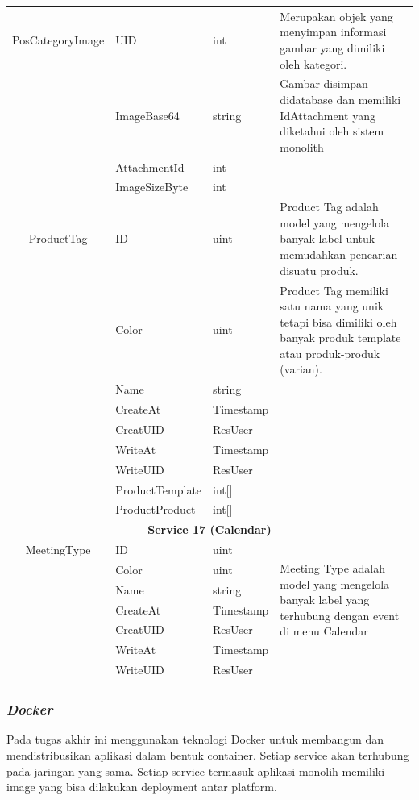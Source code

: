 \begin{longtable}{|c|p{3cm}|p{3cm}|p{4cm}|}
	\hline
	PosCategoryImage & UID & int & Merupakan objek yang menyimpan informasi gambar yang dimiliki oleh kategori. \\
	\cline{2-3}
	& ImageBase64 & string & Gambar disimpan didatabase dan memiliki IdAttachment yang diketahui oleh sistem monolith\\
	\cline{2-3}
	& AttachmentId & int & \\
	\cline{2-3}
	& ImageSizeByte & int & \\

	\hline
	ProductTag & ID & uint & Product Tag adalah model yang mengelola banyak label untuk memudahkan pencarian disuatu  produk. \\
	\cline{2-3}
	& Color & uint & Product Tag memiliki satu nama yang unik tetapi bisa dimiliki oleh banyak produk template atau produk-produk (varian). \\
	\cline{2-3}
	& Name & string & \\
	\cline{2-3}
	& CreateAt & Timestamp & \\
	\cline{2-3}
	& CreatUID & ResUser & \\
	\cline{2-3}
	& WriteAt & Timestamp & \\
	\cline{2-3}
	& WriteUID & ResUser & \\
	\cline{2-3}
	& ProductTemplate & int[] & \\
	\cline{2-3}
	& ProductProduct & int[] & \\
	\hline

	\multicolumn{4}{|c|}{\textbf{Service 17 (Calendar)}} \\
	\hline
	MeetingType & ID & uint & \multirow{6}{4cm}{Meeting Type adalah model yang mengelola banyak label yang terhubung dengan event di menu Calendar} \\
	\cline{2-3}
	& Color & uint & \\
	\cline{2-3}
	& Name & string & \\
	\cline{2-3}
	& CreateAt & Timestamp & \\
	\cline{2-3}
	& CreatUID & ResUser & \\
	\cline{2-3}
	& WriteAt & Timestamp & \\
	\cline{2-3}
	& WriteUID & ResUser & \\
	\hline
\end{longtable}

\subsubsection{\textit{Docker} }
Pada tugas akhir ini menggunakan teknologi Docker untuk membangun dan mendistribusikan aplikasi dalam bentuk container. Setiap service akan terhubung pada jaringan yang sama. Setiap service termasuk aplikasi monolih memiliki image yang bisa dilakukan deployment antar platform. 

